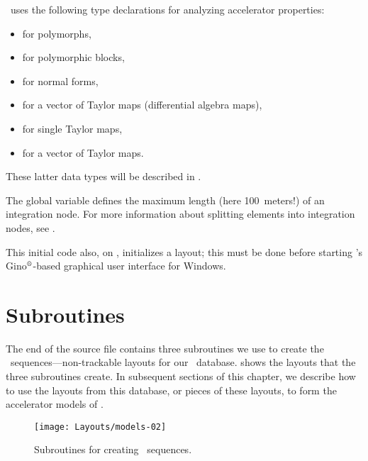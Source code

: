 \PTC\ uses the following type declarations for analyzing accelerator
properties:
\begin{itemize}
  \item {} for polymorphs,
  \item {} for polymorphic blocks,
  \item {} for normal forms,
  \item {} for a vector of Taylor maps
        (differential algebra maps),
  \item {} for single Taylor maps,
  \item {} for a vector of Taylor maps.
\end{itemize}
These latter data types will be described in .

%
The global variable  defines the maximum length (here
100~meters!) of an integration node. For more information about
splitting elements into integration nodes,
see .

This initial code also, on , initializes a layout;
this must be done before starting \PTC's
Gino$^\text{\textregistered}$-based graphical user interface for Windows.


\section{Subroutines}
\label{sec:geom.sub}

%
The end of the  source file contains three
subroutines we use to create the \DNA\ sequences---non-trackable
layouts for our \DNA\ database.  shows the
layouts that the three subroutines create. In subsequent sections
of this chapter, we describe how to use the layouts from this database,
or pieces of these layouts, to form the accelerator models of
.

\begin{figure}[ht]
  \centering
  \texttt{[image: Layouts/models-02]}
  \caption{Subroutines for creating \DNA\ sequences.}
  \label{fig:DNA.subrtns}
\end{figure}



